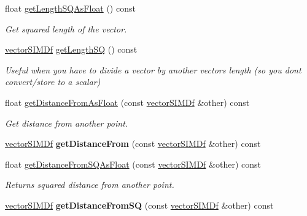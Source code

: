 \begin{DoxyCompactItemize}
\item 
float \hyperlink{classirr_1_1core_1_1vectorSIMDf_ade174de2b6537e4c8679aedaf40f23a5}{get\+Length\+S\+Q\+As\+Float} () const 
\begin{DoxyCompactList}\small\item\em Get squared length of the vector. \end{DoxyCompactList}\item 
\hyperlink{classirr_1_1core_1_1vectorSIMDf}{vector\+S\+I\+M\+Df} \hyperlink{classirr_1_1core_1_1vectorSIMDf_a9204995d330747b22fa7e2f96b669e81}{get\+Length\+SQ} () const \hypertarget{classirr_1_1core_1_1vectorSIMDf_a9204995d330747b22fa7e2f96b669e81}{}\label{classirr_1_1core_1_1vectorSIMDf_a9204995d330747b22fa7e2f96b669e81}

\begin{DoxyCompactList}\small\item\em Useful when you have to divide a vector by another vector\textquotesingle{}s length (so you dont convert/store to a scalar) \end{DoxyCompactList}\item 
float \hyperlink{classirr_1_1core_1_1vectorSIMDf_a1778db3c1e554c1015b658c85863cb9b}{get\+Distance\+From\+As\+Float} (const \hyperlink{classirr_1_1core_1_1vectorSIMDf}{vector\+S\+I\+M\+Df} \&other) const 
\begin{DoxyCompactList}\small\item\em Get distance from another point. \end{DoxyCompactList}\item 
\hyperlink{classirr_1_1core_1_1vectorSIMDf}{vector\+S\+I\+M\+Df} {\bfseries get\+Distance\+From} (const \hyperlink{classirr_1_1core_1_1vectorSIMDf}{vector\+S\+I\+M\+Df} \&other) const \hypertarget{classirr_1_1core_1_1vectorSIMDf_a84b5f45a0690a3415c2f703dcb488f58}{}\label{classirr_1_1core_1_1vectorSIMDf_a84b5f45a0690a3415c2f703dcb488f58}

\item 
float \hyperlink{classirr_1_1core_1_1vectorSIMDf_af9f145fc9d0cddfaece712ff0ceecd0f}{get\+Distance\+From\+S\+Q\+As\+Float} (const \hyperlink{classirr_1_1core_1_1vectorSIMDf}{vector\+S\+I\+M\+Df} \&other) const 
\begin{DoxyCompactList}\small\item\em Returns squared distance from another point. \end{DoxyCompactList}\item 
\hyperlink{classirr_1_1core_1_1vectorSIMDf}{vector\+S\+I\+M\+Df} {\bfseries get\+Distance\+From\+SQ} (const \hyperlink{classirr_1_1core_1_1vectorSIMDf}{vector\+S\+I\+M\+Df} \&other) const \hypertarget{classirr_1_1core_1_1vectorSIMDf_a86eb11ca1f9cddeab90e2df054ceb86e}{}\label{classirr_1_1core_1_1vectorSIMDf_a86eb11ca1f9cddeab90e2df054ceb86e}


\end{DoxyCompactItemize}
